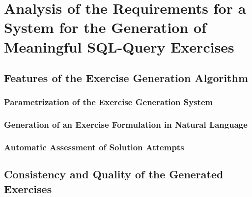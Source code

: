 \chapter{Analysis of the Requirements for a System for the Generation of Meaningful SQL-Query Exercises}
\label{ch:anal}

\section{Features of the Exercise Generation Algorithm}
\label{sec:anal:features}


\subsection{Parametrization of the Exercise Generation System}
\label{sec:anal:parametrization}


\subsection{Generation of an Exercise Formulation in Natural Language}
\label{sec:anal:description}


\subsection{Automatic Assessment of Solution Attempts}
\label{sec:anal:marking}





\section{Consistency and Quality of the Generated Exercises}
\label{sec:anal:quality}

